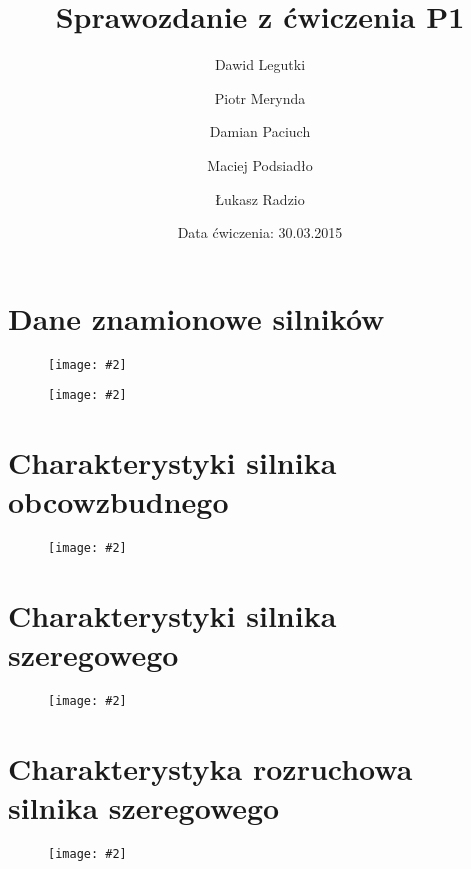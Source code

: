 \documentclass[12pt]{article}
\title{Sprawozdanie z ćwiczenia P1}
\author{ 
Dawid Legutki \and Piotr Merynda \and Damian Paciuch \and Maciej Podsiadło \and Łukasz Radzio}
\date{Data ćwiczenia: 30.03.2015}
\newcommand{\obrazek}[2]
{
	\begin{figure}[H]
	\centering
	\texttt{[image: \#2]}
	\end{figure}
}
\begin{document}
\maketitle
\section{Dane znamionowe silników}
	\obrazek{12}{tabele/DZ_obcowzbudny}
	\obrazek{12}{tabele/DZ_szeregowy}
\section{Charakterystyki silnika obcowzbudnego}

	\obrazek{12}{wykresy/Obcowzbudny}
	
	
\section{Charakterystyki silnika szeregowego}

	\obrazek{12}{wykresy/Szeregowy}
	
	
\section{Charakterystyka rozruchowa silnika szeregowego}

	\obrazek{12}{wykresy/Rozruchowa}
	
\end{document}
